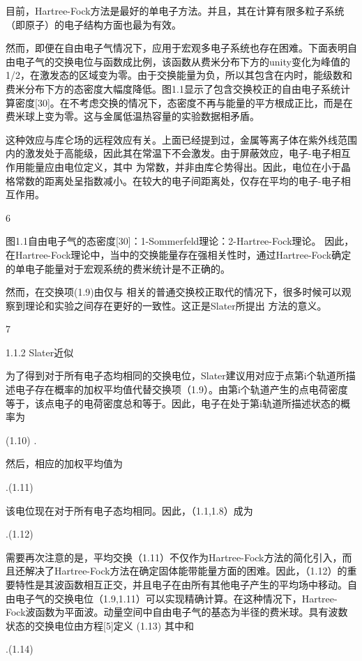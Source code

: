 目前，Hartree-Fock方法是最好的单电子方法。并且，其在计算有限多粒子系统（即原子）的电子结构方面也最为有效。

然而，即便在自由电子气情况下，应用于宏观多电子系统也存在困难。下面表明自由电子气的交换电位与函数成比例，该函数从费米分布下方的unity变化为峰值的1/2，在激发态的区域变为零。由于交换能量为负，所以其包含在内时，能级数和费米分布下方的态密度大幅度降低。图1.1显示了包含交换校正的自由电子系统计算密度[30]。在不考虑交换的情况下，态密度不再与能量的平方根成正比，而是在费米球上变为零。这与金属低温热容量的实验数据相矛盾。

这种效应与库仑场的远程效应有关。上面已经提到过，金属等离子体在紫外线范围内的激发处于高能级，因此其在常温下不会激发。由于屏蔽效应，电子-电子相互作用能量应由电位定义，其中 为常数，并非由库仑势得出。因此，电位在小于晶格常数的距离处呈指数减小。在较大的电子间距离处，仅存在平均的电子-电子相互作用。 

6



图1.1自由电子气的态密度[30]：1-Sommerfeld理论：2-Hartree-Fock理论。
因此，在Hartree-Fock理论中，当中的交换能量存在强相关性时，通过Hartree-Fock确定的单电子能量对于宏观系统的费米统计是不正确的。 

然而，在交换项(1.9)由仅与  相关的普通交换校正取代的情况下，很多时候可以观察到理论和实验之间存在更好的一致性。这正是Slater所提出  方法的意义。

7


1.1.2  Slater近似

为了得到对于所有电子态均相同的交换电位，Slater建议用对应于点第i个轨道所描述电子存在概率的加权平均值代替交换项（1.9）。由第i个轨道产生的点电荷密度等于，该点电子的电荷密度总和等于。因此，电子在处于第i轨道所描述状态的概率为


(1.10)
.

然后，相应的加权平均值为

.(1.11)

该电位现在对于所有电子态均相同。因此，（1.1,1.8）成为

.(1.12)

需要再次注意的是，平均交换（1.11）不仅作为Hartree-Fock方法的简化引入，而且还解决了Hartree-Fock方法在确定固体能带能量方面的困难。因此，（1.12）的重要特性是其波函数相互正交，并且电子在由所有其他电子产生的平均场中移动。自由电子气的交换电位（1.9,1.11）可以实现精确计算。在这种情况下，Hartree-Fock波函数为平面波。动量空间中自由电子气的基态为半径的费米球。具有波数状态的交换电位由方程[5]定义
(1.13)
其中和

.(1.14)

